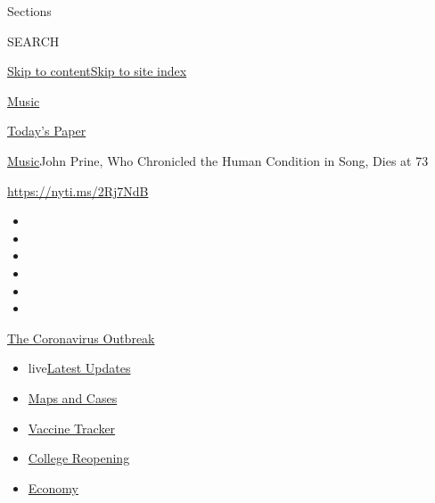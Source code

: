 Sections

SEARCH

\protect\hyperlink{site-content}{Skip to
content}\protect\hyperlink{site-index}{Skip to site index}

\href{https://www.nytimes.com/section/arts/music}{Music}

\href{https://myaccount.nytimes.com/auth/login?response_type=cookie\&client_id=vi}{}

\href{https://www.nytimes.com/section/todayspaper}{Today's Paper}

\href{/section/arts/music}{Music}\textbar{}John Prine, Who Chronicled
the Human Condition in Song, Dies at 73

\url{https://nyti.ms/2Rj7NdB}

\begin{itemize}
\item
\item
\item
\item
\item
\item
\end{itemize}

\href{https://www.nytimes.com/news-event/coronavirus?action=click\&pgtype=Article\&state=default\&region=TOP_BANNER\&context=storylines_menu}{The
Coronavirus Outbreak}

\begin{itemize}
\tightlist
\item
  live\href{https://www.nytimes.com/2020/08/03/world/coronavirus-covid-19.html?action=click\&pgtype=Article\&state=default\&region=TOP_BANNER\&context=storylines_menu}{Latest
  Updates}
\item
  \href{https://www.nytimes.com/interactive/2020/us/coronavirus-us-cases.html?action=click\&pgtype=Article\&state=default\&region=TOP_BANNER\&context=storylines_menu}{Maps
  and Cases}
\item
  \href{https://www.nytimes.com/interactive/2020/science/coronavirus-vaccine-tracker.html?action=click\&pgtype=Article\&state=default\&region=TOP_BANNER\&context=storylines_menu}{Vaccine
  Tracker}
\item
  \href{https://www.nytimes.com/2020/08/02/us/covid-college-reopening.html?action=click\&pgtype=Article\&state=default\&region=TOP_BANNER\&context=storylines_menu}{College
  Reopening}
\item
  \href{https://www.nytimes.com/live/2020/08/03/business/stock-market-today-coronavirus?action=click\&pgtype=Article\&state=default\&region=TOP_BANNER\&context=storylines_menu}{Economy}
\end{itemize}

